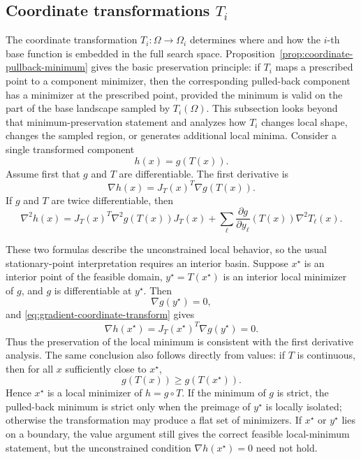 \documentclass[journal]{IEEEtran}
\theoremstyle{remark}
\theoremstyle{plain}
\begin{document}
\subsection{\texorpdfstring{Coordinate transformations \(T_i\)}{Coordinate transformations Ti}}
\label{subsec:coordinate-transformations}


The coordinate transformation \(T_i:\Omega\to\Omega_i\) determines where and how
the \(i\)-th base function is embedded in the full search space.
Proposition~\ref{prop:coordinate-pullback-minimum} gives the basic preservation
principle: if \(T_i\) maps a prescribed point to a component minimizer, then
the corresponding pulled-back component has a minimizer at the prescribed
point, provided the minimum is valid on the part of the base landscape sampled
by \(T_i(\Omega)\). This subsection looks beyond that minimum-preservation
statement and analyzes how \(T_i\) changes local shape, changes the sampled
region, or generates additional local minima.
Consider a single transformed component
\[
h(x)=g(T(x)).
\]
Assume first that \(g\) and \(T\) are differentiable. The first derivative is
\begin{equation}
	\nabla h(x)=J_T(x)^T\nabla g(T(x)).
	\label{eq:gradient-coordinate-transform}
\end{equation}
If \(g\) and \(T\) are twice differentiable, then
\begin{equation}
	\nabla^2 h(x)
	=
	J_T(x)^T\nabla^2 g(T(x))J_T(x)
	+
	\sum_{\ell}
	\frac{\partial g}{\partial y_\ell}(T(x))\nabla^2 T_\ell(x).
	\label{eq:hessian-nonlinear-transform}
\end{equation}

These two formulas describe the unconstrained local behavior, so the usual
stationary-point interpretation requires an interior basin. Suppose
\(x^\star\) is an interior point of the feasible domain, \(y^\star=T(x^\star)\)
is an interior local minimizer of \(g\), and \(g\) is differentiable at
\(y^\star\). Then
\[
	\nabla g(y^\star)=0,
\]
and \eqref{eq:gradient-coordinate-transform} gives
\[
	\nabla h(x^\star)
	=
	J_T(x^\star)^T\nabla g(y^\star)
	=
	0.
\]
Thus the preservation of the local minimum is consistent with the first
derivative analysis. The same conclusion also follows directly from values: if
\(T\) is continuous, then for all \(x\) sufficiently close to \(x^\star\),
\[
g(T(x))\ge g(T(x^\star)).
\]
Hence \(x^\star\) is a local minimizer of \(h=g\circ T\). If the minimum of
\(g\) is strict, the pulled-back minimum is strict only when the preimage of
\(y^\star\) is locally isolated; otherwise the transformation may produce a
flat set of minimizers. If \(x^\star\) or \(y^\star\) lies on a boundary, the
value argument still gives the correct feasible local-minimum statement, but
the unconstrained condition \(\nabla h(x^\star)=0\) need not hold.
\end{document}
